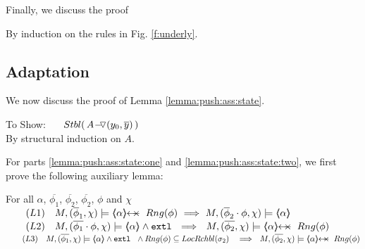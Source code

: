 \vspace{1cm} Finally, we discuss the proof


\newcommand{\SP}{$\strut \ \ \ \ $}

By induction on the rules in Fig. \ref{f:underly}.

\completeProof 

\subsection{Adaptation}
\label{appendix:adaptation}
 
 
 We now discuss the proof of Lemma \ref{lemma:push:ass:state}.

 \vspace{0.5cm}
 
$~$ \\
To Show: \ \ \  $\Stable{\,  \PushASLong {(y_0,\overline y)} A\, }$
\\
By structural induction on $A$.\\
\completeProofSub

\vspace{1cm}

For parts \ref{lemma:push:ass:state:one} and \ref{lemma:push:ass:state:two}, we first prove the following auxiliary lemma:

\begin{auxLemma}
\label{l:push:pop:aux}
For all $\alpha$,   $\overline {\phi_1}$, $\overline {\phi_2}$, $\overline {\phi_2}$, $\phi$ and $\chi$\\
$\strut ~ \ \ \ \ \ (L1)\ \ \    M, (\overline \phi_1,\chi) \models \protectedFrom \alpha {Rng(\phi)} \ \Longrightarrow \ M, (\overline \phi_2\cdot \phi,\chi) \models \inside \alpha$
\\
$\strut ~ \ \ \ \ \ (L2)\ \ \    M, (\overline {\phi_1}\cdot\phi,\chi) \models \inside \alpha   \wedge \extThis \ \ \Longrightarrow \ \ M, (\overline {\phi_2},\chi) \models \protectedFrom \alpha {Rng(\phi)} $
$\strut ~ \ \ \ \ \ (L3)\ \ \    M, (\overline {\phi_1},\chi) \models \inside \alpha   \wedge \extThis \ \ \wedge Rng(\phi)\subseteq \LRelevantO {\sigma_2} \ \ \  \Longrightarrow \ \ M, (\overline {\phi_2},\chi) \models \protectedFrom \alpha {Rng(\phi)} $
\\\end{auxLemma}

